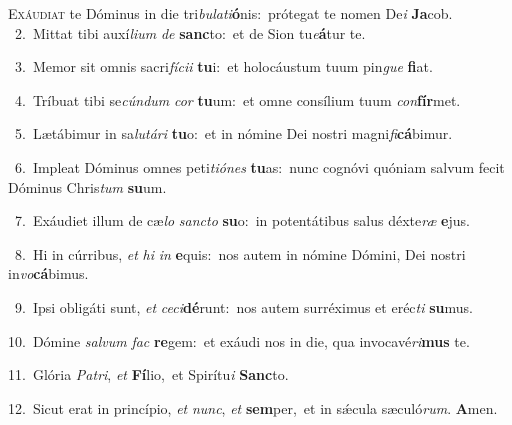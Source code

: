 \lettrine{\initial\textcolor{\initialcolor}{E}}{xáudiat} te Dóminus in die tri\-\textit{bu}\-\textit{la}\textit{ti}\textbf{ó}nis:~\star prótegat te nomen De\textit{i} \textbf{Ja}\-cob.\\
{\numbfont\textcolor{\numbcolor}{~2.}}~Mittat tibi auxí\-\textit{li}\-\textit{um} \textit{de} \textbf{sanc}\-to:~\star et de Sion tu\-\textit{e}\-\textbf{á}tur te.\par
{\numbfont\textcolor{\numbcolor}{~3.}}~Memor sit omnis sacri\-\textit{fí}\-\textit{ci}\textit{i} \textbf{tu}\-i:~\star et holocáustum tuum pin\textit{gue} \textbf{fi}\-at.\par
{\numbfont\textcolor{\numbcolor}{~4.}}~Tríbuat tibi se\-\textit{cún}\-\textit{dum} \textit{cor} \textbf{tu}\-um:~\star et omne consílium tuum \textit{con}\-\textbf{fír}met.\par
{\numbfont\textcolor{\numbcolor}{~5.}}~Lætábimur in sa\-\textit{lu}\-\textit{tá}\textit{ri} \textbf{tu}\-o:~\star et in nómine Dei nostri magni\-\textit{fi}\-\textbf{cá}bimur.\par
{\numbfont\textcolor{\numbcolor}{~6.}}~Impleat Dóminus omnes peti\-\textit{ti}\-\textit{ó}\textit{nes} \textbf{tu}\-as:~\star nunc cognóvi quóniam salvum fecit Dóminus Chris\textit{tum} \textbf{su}\-um.\par
{\numbfont\textcolor{\numbcolor}{~7.}}~Exáudiet illum de cæ\textit{lo} \textit{sanc}\-\textit{to} \textbf{su}\-o:~\star in potentátibus salus déxte\textit{ræ} \textbf{e}\-jus.\par
{\numbfont\textcolor{\numbcolor}{~8.}}~Hi in cúrribus, \textit{et} \textit{hi} \textit{in} \textbf{e}\-quis:~\star nos autem in nómine Dómini, Dei nostri in\-\textit{vo}\-\textbf{cá}bimus.\par
{\numbfont\textcolor{\numbcolor}{~9.}}~Ipsi obligáti sunt, \textit{et} \textit{ce}\-\textit{ci}\textbf{dé}runt:~\star nos autem surréximus et eréc\textit{ti} \textbf{su}\-mus.\par
{\numbfont\textcolor{\numbcolor}{10.}}~Dómine \textit{sal}\-\textit{vum} \textit{fac} \textbf{re}\-gem:~\star et exáudi nos in die, qua invocavé\-\textit{ri}\-\textbf{mus} te.\par
{\numbfont\textcolor{\numbcolor}{11.}}~Glória \textit{Pa}\-\textit{tri}, \textit{et} \textbf{Fí}\-lio,~\star et Spirítu\textit{i} \textbf{Sanc}\-to.\par
{\numbfont\textcolor{\numbcolor}{12.}}~Sicut erat in princípio, \textit{et} \textit{nunc}\-, \textit{et} \textbf{sem}\-per,~\star et in sǽcula sæculó\-\textit{rum}\-. \textbf{A}\-men.\par
